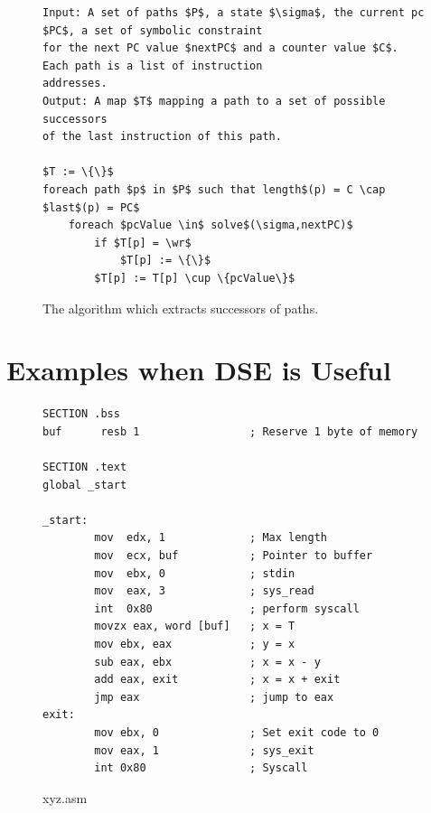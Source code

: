 \documentclass{kththesis}
\begin{document}
\begin{figure}[!htbp]
    \centering
\begin{lstlisting}[style=algorithm]
Input: A set of paths $P$, a state $\sigma$, the current pc $PC$, a set of symbolic constraint 
for the next PC value $nextPC$ and a counter value $C$. Each path is a list of instruction
addresses. 
Output: A map $T$ mapping a path to a set of possible successors 
of the last instruction of this path.

$T := \{\}$
foreach path $p$ in $P$ such that length$(p) = C \cap $last$(p) = PC$
    foreach $pcValue \in$ solve$(\sigma,nextPC)$
        if $T[p] = \wr$
            $T[p] := \{\}$    
        $T[p] := T[p] \cup \{pcValue\}$

\end{lstlisting}
\caption[The algorithm which extracts successors of paths.]{The algorithm which extracts successors of paths.}
    \label{fig:DSEextract}
\end{figure}



\section{Examples when DSE is Useful}
\begin{figure}[t]
    \centering
\begin{tcolorbox}
\begin{verbatim}
SECTION .bss
buf      resb 1                 ; Reserve 1 byte of memory

SECTION .text
global _start

_start:
        mov  edx, 1             ; Max length
        mov  ecx, buf           ; Pointer to buffer
        mov  ebx, 0             ; stdin
        mov  eax, 3             ; sys_read
        int  0x80               ; perform syscall
        movzx eax, word [buf]   ; x = T
        mov ebx, eax            ; y = x
        sub eax, ebx            ; x = x - y 
        add eax, exit           ; x = x + exit
        jmp eax                 ; jump to eax
exit:
        mov ebx, 0              ; Set exit code to 0
        mov eax, 1              ; sys_exit
        int 0x80                ; Syscall
\end{verbatim}
\end{tcolorbox}
\caption[]{xyz.asm}
    \label{fig:xyz.asm}
\end{figure}
\end{document}
